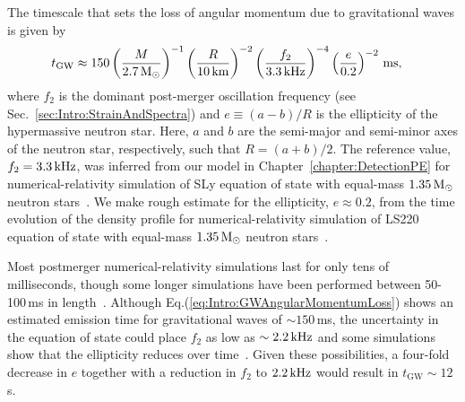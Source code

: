 \documentclass[../Thesis.tex]{subfiles}
\begin{document}
    The timescale that sets the loss of angular momentum due to gravitational waves is given by~\cite{Paschalidis2012}
    \begin{align}
        t_{\mathrm{GW}} & \approx 150 \left(\frac{M}{2.7\,\mathrm{M}_{\odot}}\right)^{-1}\left(\frac{R}{10\,\mathrm{km}}\right)^{-2}\left(\frac{f_2}{3.3\,\mathrm{kHz}} \right)^{-4}\left(\frac{e}{0.2} \right)^{-2}\,\mathrm{ms}, \label{eq:Intro:GWAngularMomentumLoss}        
    \end{align}
    where $f_2$ is the dominant post-merger oscillation frequency (see Sec.~\ref{sec:Intro:StrainAndSpectra}) and $e\equiv(a-b)/R$ is the ellipticity of the hypermassive neutron star. 
    Here, $a$ and $b$ are the semi-major and semi-minor axes of the neutron star, respectively, such that $R=(a+b)/2$.
    The reference value, $f_2=3.3\,\mathrm{kHz}$, was inferred from our model in Chapter~\ref{chapter:DetectionPE} for numerical-relativity simulation of SLy equation of state with equal-mass $1.35\,\mathrm{M}_{\odot}$ neutron stars~\cite{Radice2016}.
    We make rough estimate for the ellipticity,  $e\approx0.2$, from the time evolution of the density profile for numerical-relativity simulation of LS220 equation of state with equal-mass $1.35\,\mathrm{M}_{\odot}$ neutron stars~\cite{Radice2017}.\par
    
    Most postmerger numerical-relativity simulations last for only tens of milliseconds, though some longer simulations have been performed between 50-100\,ms in length~\cite{Rezzolla2010,Ciolfi2017,Ciolfi2019,DePietri2020}.
    Although Eq.(\ref{eq:Intro:GWAngularMomentumLoss}) shows an estimated emission time for gravitational waves of $\sim 150\,$ms, the uncertainty in the equation of state could place $f_2$ as low as $\sim 2.2\,\mathrm{kHz}$ and some simulations show that the ellipticity reduces over time~\cite{Takami2015,Shibata2017a}.
    Given these possibilities, a four-fold decrease in $e$ together with a reduction in $f_2$ to $2.2\,\mathrm{kHz}$ would result in $t_{\mathrm{GW}} \sim 12\,$s.
    
\end{document}
